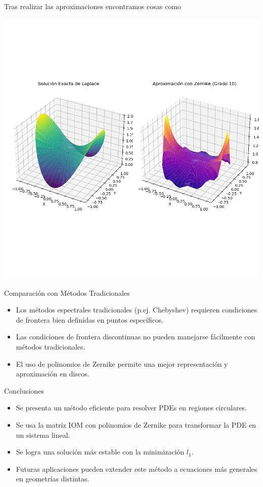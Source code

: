 \documentclass{beamer}
\begin{document}
\begin{frame}
  Tras realizar las aproximaciones encontramos cosas como
  \begin{center}
    \includegraphics[scale=0.4]{Figures/polortsegundo.png}
  \end{center}
\end{frame}

\begin{frame}{Comparación con Métodos Tradicionales}
    \begin{itemize}
        \item Los métodos espectrales tradicionales (p.ej. Chebyshev) requieren condiciones de frontera bien definidas en puntos específicos.
        \item Las condiciones de frontera discontinuas no pueden manejarse fácilmente con métodos tradicionales.
        \item El uso de polinomios de Zernike permite una mejor representación y aproximación en discos.
    \end{itemize}
\end{frame}

\begin{frame}{Conclusiones}
    \begin{itemize}
        \item Se presenta un método eficiente para resolver PDEs en regiones circulares.
        \item Se usa la matriz IOM con polinomios de Zernike para transformar la PDE en un sistema lineal.
        \item Se logra una solución más estable con la minimización \( l_1 \).
        \item Futuras aplicaciones pueden extender este método a ecuaciones más generales en geometrías distintas.
    \end{itemize}
\end{frame}
\end{document}
